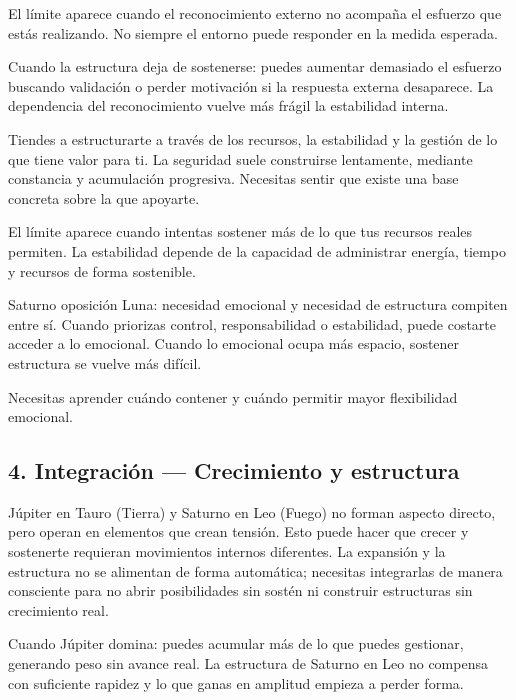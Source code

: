 \documentclass[11pt,a4paper]{article}
\begin{document}
El límite aparece cuando el reconocimiento externo no acompaña el esfuerzo que estás realizando. No siempre el entorno puede responder en la medida esperada.

Cuando la estructura deja de sostenerse: puedes aumentar demasiado el esfuerzo buscando validación o perder motivación si la respuesta externa desaparece. La dependencia del reconocimiento vuelve más frágil la estabilidad interna.

Tiendes a estructurarte a través de los recursos, la estabilidad y la gestión de lo que tiene valor para ti. La seguridad suele construirse lentamente, mediante constancia y acumulación progresiva. Necesitas sentir que existe una base concreta sobre la que apoyarte.

El límite aparece cuando intentas sostener más de lo que tus recursos reales permiten. La estabilidad depende de la capacidad de administrar energía, tiempo y recursos de forma sostenible.

Saturno oposición Luna: necesidad emocional y necesidad de estructura compiten entre sí. Cuando priorizas control, responsabilidad o estabilidad, puede costarte acceder a lo emocional. Cuando lo emocional ocupa más espacio, sostener estructura se vuelve más difícil.

Necesitas aprender cuándo contener y cuándo permitir mayor flexibilidad emocional.

\vspace{0.8cm}


\subsection{4. Integración — Crecimiento y estructura}

Júpiter en Tauro (Tierra) y Saturno en Leo (Fuego) no forman aspecto directo, pero operan en elementos que crean tensión. Esto puede hacer que crecer y sostenerte requieran movimientos internos diferentes. La expansión y la estructura no se alimentan de forma automática; necesitas integrarlas de manera consciente para no abrir posibilidades sin sostén ni construir estructuras sin crecimiento real.

Cuando Júpiter domina: puedes acumular más de lo que puedes gestionar, generando peso sin avance real. La estructura de Saturno en Leo no compensa con suficiente rapidez y lo que ganas en amplitud empieza a perder forma.
\end{document}
